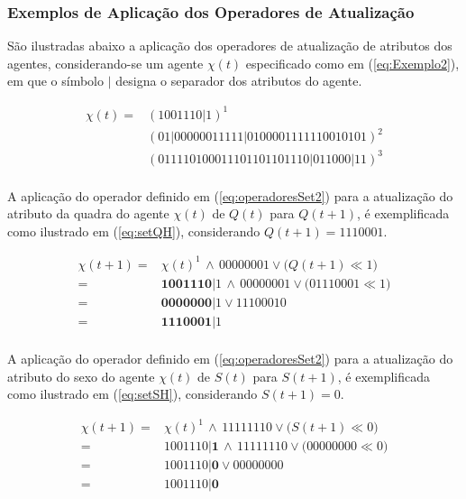 \newpage

\subsubsection{Exemplos de Aplicação dos Operadores de Atualização}

São ilustradas abaixo a aplicação dos operadores de atualização de atributos dos agentes, considerando-se um agente $\chi(t)$ especificado como em (\ref{eq:Exemplo2}), em que o símbolo $|$ designa o separador dos atributos do agente. 

\begin{equation}
\begin{split}
 \chi(t) =   & (1 0 0 1 1 1 0 | 1)^1 \\
	     & (0 1 | 0 0 0 0 0 0 1 1 1 1 1 | 0 1 0 0 0 0 1 1 1 1 1 1 0 0 1 0 1 0 1)^2 \\
	     & (0 1 1 1 1 0 1 0 0 0 1 1 1 0 1 1 0 1 1 0 1 1 1 0 | 0 1 1 0 0 0 | 1 1)^3 \\
 \label{eq:Exemplo2}
\end{split}
\end{equation}

A aplicação do operador definido em (\ref{eq:operadoresSet2}) para a atualização do atributo da quadra do agente $\chi(t)$ de $Q(t)$ para $Q(t + 1)$, é exemplificada como ilustrado em (\ref{eq:setQH}), considerando $Q(t + 1) = 1 1 1 0 0 0 1$.

\begin{equation}
 \begin{split}
 \chi(t + 1)   = & \chi(t)^1 \, \wedge \, 00000001 \vee \big(Q(t + 1) \ll 1\big) \\
	       = & \boldsymbol{1 0 0 1 1 1 0} | 1 \, \wedge \, 00000001 \vee \big(01110001 \ll 1\big) \\
	       = & \boldsymbol{0 0 0 0 0 0 0} | 1 \vee 11100010 \\
	       = & \boldsymbol{1 1 1 0 0 0 1} | 1 \\
 \label{eq:setQH}
 \end{split}
\end{equation}

A aplicação do operador definido em (\ref{eq:operadoresSet2}) para a atualização do atributo do sexo do agente $\chi(t)$ de $S(t)$ para $S(t + 1)$, é exemplificada como ilustrado em (\ref{eq:setSH}), considerando $S(t + 1) = 0$.

\begin{equation}
 \begin{split}
 \chi(t + 1)   = & \chi(t)^1 \, \wedge \, 11111110 \vee \big(S(t + 1) \ll 0\big) \\
	       = & 1 0 0 1 1 1 0 | \boldsymbol{1} \, \wedge \, 11111110 \vee \big(00000000 \ll 0\big) \\
	       = & 1 0 0 1 1 1 0 | \boldsymbol{0} \vee 00000000 \\
	       = & 1 0 0 1 1 1 0 | \boldsymbol{0} \\
 \label{eq:setSH}
 \end{split}
\end{equation}

